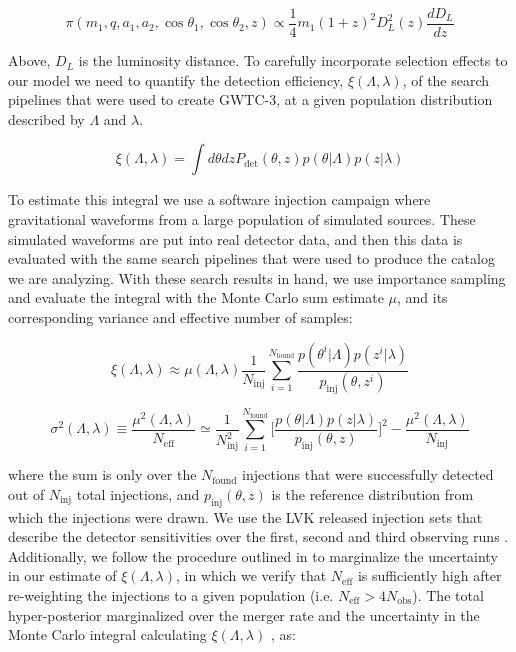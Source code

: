 \begin{equation}
    \pi(m_1, q, a_1, a_2, \cos{\theta_1}, \cos{\theta_2}, z) \propto \frac{1}{4} m_1 (1+z)^2 D_L^2(z) \frac{dD_L}{dz}
\end{equation}

\noindent Above, $D_L$ is the luminosity distance. To carefully incorporate selection effects to our model we need to quantify the detection efficiency,
$\xi(\Lambda, \lambda)$, of the search pipelines that were used to create GWTC-3, at a given population distribution described by $\Lambda$ and $\lambda$.
 
\begin{equation}
     \xi(\Lambda, \lambda) = \int d\theta dz P_\mathrm{det}(\theta, z)p(\theta | \Lambda) p(z | \lambda)
\end{equation}
 
\noindent
To estimate this integral we use a software injection campaign where gravitational waveforms from a large population of simulated sources. 
These simulated waveforms are put into real detector data, and then this data is evaluated with the same search pipelines that were used to 
produce the catalog we are analyzing. With these search results in hand, we use importance sampling and evaluate the integral 
with the Monte Carlo sum estimate $\mu$, and its corresponding variance and effective number of samples:

\begin{equation} \label{xi}
     \xi(\Lambda, \lambda) \approx \mu(\Lambda, \lambda) \frac{1}{N_\mathrm{inj}} \sum_{i=1}^{N_\mathrm{found}} \frac{p(\theta^i | \Lambda) p(z^i | \lambda)}{p_\mathrm{inj}(\theta, z^i)}
\end{equation}

\begin{equation}
    \sigma^2(\Lambda, \lambda) \equiv \frac{\mu^2(\Lambda, \lambda)}{N_\mathrm{eff}} \simeq \frac{1}{N^2_\mathrm{inj}} \sum_{i=1}^{N_\mathrm{found}} \bigg[\frac{p(\theta | \Lambda) p(z | \lambda)}{p_\mathrm{inj}(\theta, z)}\bigg]^2 - \frac{\mu^2(\Lambda, \lambda)}{N_\mathrm{inj}}
\end{equation}

\noindent
where the sum is only over the $N_\mathrm{found}$ injections that were successfully detected out of $N_\mathrm{inj}$ total injections, 
and $p_\mathrm{inj}(\theta, z)$ is the reference distribution from which the injections were drawn. We use the LVK released injection sets that describe the 
detector sensitivities over the first, second and third observing runs \citep{O1O2O3InjectionSets}. Additionally, we follow the procedure 
outlined in \citet{Farr_2019} to marginalize the uncertainty in our estimate of $\xi(\Lambda, \lambda)$, in which we verify that $N_\mathrm{eff}$ is 
sufficiently high after re-weighting the injections to a given population (i.e. $N_\mathrm{eff} > 4N_\mathrm{obs}$). 
The total hyper-posterior marginalized over the merger rate and the uncertainty in the Monte Carlo integral calculating $\xi(\Lambda, \lambda)$ \citep{Farr_2019}, as:

